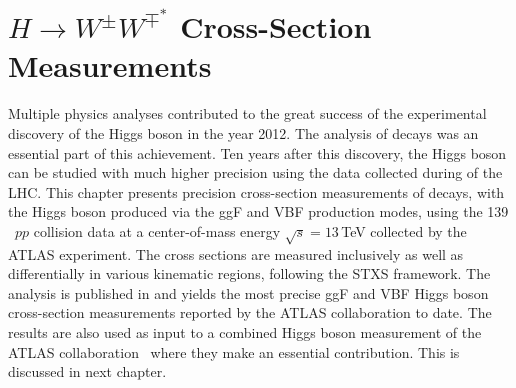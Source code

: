 \chapter{$H\rightarrow W^{\pm}W^{\mp^*}$ Cross-Section Measurements}
\label{chap:hww}
Multiple physics analyses contributed to the great success of the experimental discovery of the Higgs boson in the year 2012. The analysis of \HWW decays was an essential part of this achievement. 
Ten years after this discovery, the Higgs boson can be studied with much higher precision using the data collected during \RunTwo of the LHC. 
This chapter presents precision cross-section measurements of \HWW decays, with the Higgs boson produced via the ggF and VBF production modes, using the 139\,\ifb\ $pp$ collision data at a center-of-mass energy $\sqrt{s} = 13\,$TeV collected by the ATLAS experiment.
The cross sections are measured inclusively as well as differentially in various kinematic regions, following the STXS framework.
The analysis is published in  and yields the most precise ggF and VBF Higgs boson cross-section measurements reported by the ATLAS collaboration to date.
The results are also used as input to a combined Higgs boson measurement of the ATLAS collaboration~\cite{NaturePaper} where they make an essential contribution. This is discussed in next chapter. 

